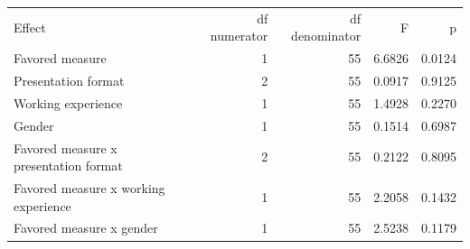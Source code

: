 \begin{tabular}{lrrrr}
Effect & df numerator & df denominator & F & p \\
Favored measure &  1 & 55 &  6.6826 &  0.0124 \\
Presentation format &  2 & 55 &  0.0917 &  0.9125 \\
Working experience &  1 & 55 &  1.4928 &  0.2270 \\
Gender &  1 & 55 &  0.1514 &  0.6987 \\
Favored measure x presentation format &  2 & 55 &  0.2122 &  0.8095 \\
Favored measure x working experience &  1 & 55 &  2.2058 &  0.1432 \\
Favored measure x gender &  1 & 55 &  2.5238 &  0.1179 \\
\end{tabular}
